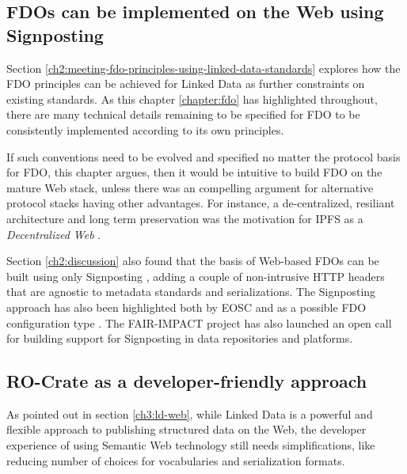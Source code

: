 \subsection{FDOs can be implemented on the Web using Signposting}

Section \vref{ch2:meeting-fdo-principles-using-linked-data-standards} explores how the FDO principles can be achieved for Linked Data as further constraints on existing standards. As this chapter \vref{chapter:fdo} has highlighted throughout, there are many technical details remaining to be specified for FDO to be consistently implemented according to its own principles.

If such conventions need to be evolved and specified no matter the protocol basis for FDO, this chapter argues, then it would be intuitive to build FDO on the mature Web stack, unless there was an compelling argument for alternative protocol stacks having other advantages. For instance, a de-centralized, resiliant architecture and long term preservation was the motivation for IPFS as a \emph{Decentralized Web} \cite{Trautwein 2022}.

Section \ref{ch2:discussion} also found that the basis of Web-based FDOs can be built using only Signposting \cite{vandesompel2015,Van de Sompel 2022}, adding a couple of non-intrusive HTTP headers that are agnostic to metadata standards and serializations. 
The Signposting approach has also been highlighted both by EOSC \cite{10.5281/zenodo.7463421} and as a possible FDO configuration type \cite{fdo-ConfigurationTypes}. The FAIR-IMPACT project has also launched an open call for building support for Signposting \cite{soilandreyes2023b} in data repositories and platforms.



\subsection{RO-Crate as a developer-friendly approach}

As pointed out in section \vref{ch3:ld-web}, while Linked Data is a powerful and flexible approach to publishing structured data on the Web, the developer experience of using Semantic Web technology still needs simplifications, like reducing number of choices for vocabularies and serialization formats. 

